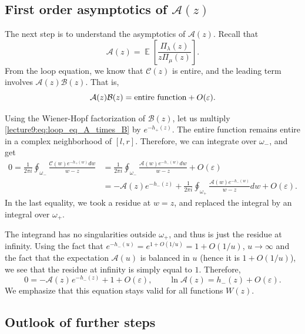 \documentclass[letterpaper,11pt,oneside,reqno]{book}
\numberwithin{equation}{chapter}  %
\newcommand{\ssp}{\hspace{1pt}}
\theoremstyle{definition}
\begin{document}
\subsection{First order asymptotics of $\mathcal{A}(z)$}

The next step is to understand the asymptotics of $\mathcal{A}(z)$. Recall that
\begin{equation}
	\label{lecture9:eq:A_definition}
	\mathcal{A}(z)=\operatorname{\mathbb{E}}\left[ \frac{\Pi_\lambda(z)}{z\Pi_\mu(z)} \right].
\end{equation}
From the loop equation, we know that $\mathcal{C}(z)$ is entire, and the leading term involves $\mathcal{A}(z)\mathcal{B}(z)$. That is,
\begin{equation}
	\label{lecture9:eq:loop_eq_A_times_B}
	\mathcal{A}(z)\mathcal{B}(z) = \textnormal{entire function} + O(\varepsilon).
\end{equation}

Using the Wiener-Hopf factorization of $\mathcal{B}(z)$, let
us multiply \eqref{lecture9:eq:loop_eq_A_times_B}
by $e^{-h_+(z)}$. The entire function remains entire in a complex
neighborhood of $[l,r]$. Therefore, we can integrate over $\omega_-$, and get
\begin{align*}
	0=
	\frac{1}{2\pi i}\oint_{\omega_-}\frac{\mathcal{C}(w)e^{-h_+(w)}dw}{w-z}
	&=
	\frac{1}{2\pi i}\oint_{\omega_-}\frac{\mathcal{A}(w)e^{-h_-(w)}dw}{w-z}+O(\varepsilon)
	\\&=
	-\mathcal{A}(z)e^{-h_-(z)}+\frac{1}{2\pi i}\oint_{\omega_+}
	\frac{\mathcal{A}(w)e^{-h_-(w)}}{w-z}dw+O(\varepsilon).
\end{align*}
In the last equality, we took a residue at $w=z$, and replaced the integral
by an integral over $\omega_+$.

The integrand has no singularities outside $\omega_+$, and thus is just the residue at
infinity.
Using the fact that
$e^{-h_-(u)}=e^{1+O(1/u)}=1+O(1/u)$, $u\to\infty$
and the fact that the expectation $\mathcal{A}(u)$ is balanced in $u$
(hence it is $1+O(1/u)$),
we see that
the residue at infinity is simply equal to $1$.
Therefore,
\begin{equation*}
	0=-\mathcal{A}(z)\ssp e^{-h_-(z)}+1+O(\varepsilon),\qquad
	\ln \mathcal{A}(z)=h_-(z)+O(\varepsilon).
\end{equation*}
We emphasize that this equation stays valid for all functions $W(z)$.

\subsection{Outlook of further steps}
\end{document}
